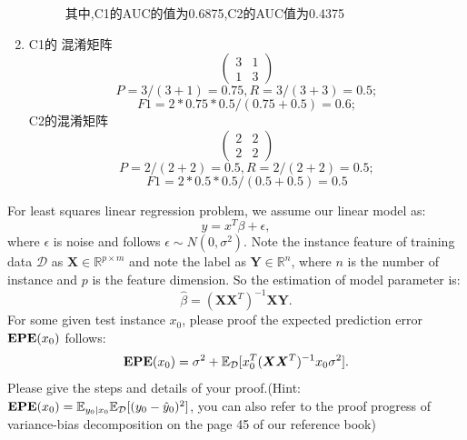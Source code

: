 \documentclass[11pt, a4paper, UTF8]{ctexart}
\begin{document}
\begin{solution}
\begin{enumerate}
\begin{figure}[h]
    	其中,C1的AUC的值为0.6875,C2的AUC值为0.4375
    \end{figure}
\item 
C1的 混淆矩阵
$$\begin{pmatrix}
3 & 1 \\
1 & 3
\end{pmatrix}$$
$$P=3/(3+1)=0.75,R=3/(3+3)=0.5;$$
$$F1=2*0.75*0.5/(0.75+0.5)=0.6;$$
C2的混淆矩阵
$$\begin{pmatrix}
2 & 2 \\
2 & 2
\end{pmatrix}$$
$$P=2/(2+2)=0.5,R=2/(2+2)=0.5;$$
$$F1=2*0.5*0.5/(0.5+0.5)=0.5$$
    \end{enumerate}
\end{solution}





\begin{problem}[TC 29.4-2]
	For least squares linear regression problem, we assume our linear model as:\\
\begin{equation}
y=x^T \beta+\epsilon,
\end{equation}
where $\epsilon$ is noise and follows $\epsilon\sim N(0,\sigma^2)$. Note the instance feature of training data $\mathcal{D}$ as $\bm{X}\in\mathbb{R}^{p\times m}$ and note the label as $\bm{Y}\in\mathbb{R}^n$, where $n$ is the number of instance and $p$ is the feature dimension. So the estimation of model parameter is:\\
\begin{equation}
\hat{\beta}=(\bm{XX}^T)^{-1}\bm{XY}.
\end{equation}
For some given test instance $x_0$, please proof the expected prediction error $\text{\bf{EPE}}(x_0)$ follows:\\
\begin{equation}
\text{\bf{EPE}}(x_0)=\sigma^2+\mathbb{E}_{\mathcal{D}}[x^T_0(\bm{XX}^T)^{-1} x_0\sigma^2].
\end{equation}
Please give the steps and details of your proof.(Hint: $\text{\bf{EPE}}(x_0)=\mathbb{E}_{y_0|x_0}\mathbb{E}_{\mathcal{D}}[(y_0-\hat{y}_0)^2]$, you can also refer to the proof progress of variance-bias decomposition on the page 45 of our reference book)
\end{problem}
\begin{solution}
    
\end{solution}
\end{document}
